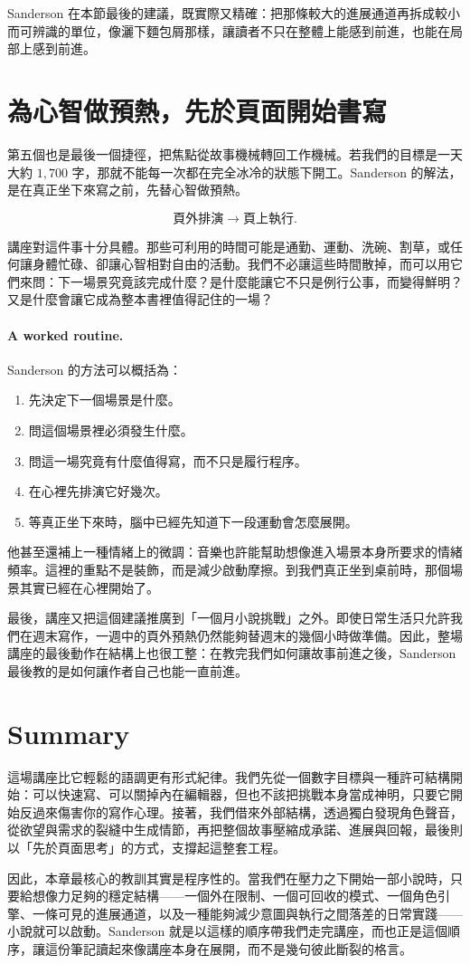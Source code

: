 Sanderson 在本節最後的建議，既實際又精確：把那條較大的進展通道再拆成較小而可辨識的單位，像灑下麵包屑那樣，讓讀者不只在整體上能感到前進，也能在局部上感到前進。

\section{為心智做預熱，先於頁面開始書寫}

第五個也是最後一個捷徑，把焦點從故事機械轉回工作機械。若我們的目標是一天大約 \(1{,}700\) 字，那就不能每一次都在完全冰冷的狀態下開工。Sanderson 的解法，是在真正坐下來寫之前，先替心智做預熱。

\begin{equation}
\text{頁外排演} \to \text{頁上執行}.
\end{equation}

講座對這件事十分具體。那些可利用的時間可能是通勤、運動、洗碗、割草，或任何讓身體忙碌、卻讓心智相對自由的活動。我們不必讓這些時間散掉，而可以用它們來問：下一場景究竟該完成什麼？是什麼能讓它不只是例行公事，而變得鮮明？又是什麼會讓它成為整本書裡值得記住的一場？

\paragraph{A worked routine.} Sanderson 的方法可以概括為：
\begin{enumerate}
\item 先決定下一個場景是什麼。
\item 問這個場景裡必須發生什麼。
\item 問這一場究竟有什麼值得寫，而不只是履行程序。
\item 在心裡先排演它好幾次。
\item 等真正坐下來時，腦中已經先知道下一段運動會怎麼展開。
\end{enumerate}

他甚至還補上一種情緒上的微調：音樂也許能幫助想像進入場景本身所要求的情緒頻率。這裡的重點不是裝飾，而是減少啟動摩擦。到我們真正坐到桌前時，那個場景其實已經在心裡開始了。

最後，講座又把這個建議推廣到「一個月小說挑戰」之外。即使日常生活只允許我們在週末寫作，一週中的頁外預熱仍然能夠替週末的幾個小時做準備。因此，整場講座的最後動作在結構上也很工整：在教完我們如何讓故事前進之後，Sanderson 最後教的是如何讓作者自己也能一直前進。

\section{Summary}

這場講座比它輕鬆的語調更有形式紀律。我們先從一個數字目標與一種許可結構開始：可以快速寫、可以關掉內在編輯器，但也不該把挑戰本身當成神明，只要它開始反過來傷害你的寫作心理。接著，我們借來外部結構，透過獨白發現角色聲音，從欲望與需求的裂縫中生成情節，再把整個故事壓縮成承諾、進展與回報，最後則以「先於頁面思考」的方式，支撐起這整套工程。

因此，本章最核心的教訓其實是程序性的。當我們在壓力之下開始一部小說時，只要給想像力足夠的穩定結構——一個外在限制、一個可回收的模式、一個角色引擎、一條可見的進展通道，以及一種能夠減少意圖與執行之間落差的日常實踐——小說就可以啟動。Sanderson 就是以這樣的順序帶我們走完講座，而也正是這個順序，讓這份筆記讀起來像講座本身在展開，而不是幾句彼此斷裂的格言。